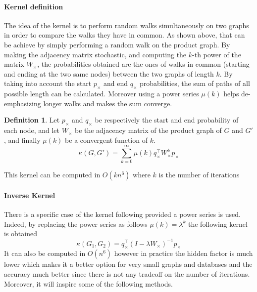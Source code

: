 \documentclass{article}
\theoremstyle{definition}
\newtheorem{definition}{Definition}
\begin{document}
\paragraph{Kernel definition}
The idea of the kernel is to perform random walks simultaneously on two graphs in order to compare the walks they have in common. As shown above, that can be achieve by simply performing a random walk on the product graph. 
By making the adjacency matrix stochastic, and computing the $k$-th power of the matrix $W_\times$, the probabilities obtained are the ones of walks in common (starting and ending at the two same nodes) between the two graphs of length $k$.
By taking into account the start $p_\times$ and end $q_\times$ probabilities, the sum of paths of all possible length can be calculated. Moreover using a power series $\mu(k)$ helps de-emphasizing longer walks and makes the sum converge. 
\begin{definition}Let $p_{\times}$ and $q_{\times}$ be respectively the start and end probability of each node, and let $W_{\times}$ be the adjacency matrix of the product graph of $G$ and $G'$, and finally $\mu(k)$ be a convergent function of $k$.
	\begin{equation}
		\kappa(G,G') = \sum\limits_{k=0}^{\infty}\mu(k)q_{\times}^{\top}W_{\times}^{k}p_{\times}
	\end{equation}
\end{definition}
This kernel can be computed in $O(kn^6)$ where $k$ is the number of iterations 
\paragraph{Inverse Kernel}
There is a specific case of the kernel following provided a power series is used. Indeed, by replacing the power series as follows $\mu(k)=\lambda^k$ the following kernel is obtained 
\begin{equation}
	\kappa(G_1,G_2)=q_{\times}^{\top}(I-\lambda W_\times)^{-1}p_{\times}
\end{equation}
It can also be computed in $O(n^6)$ however in practice the hidden factor is much lower which makes it a better option for very small graphs and databases and the accuracy much better since there is not any tradeoff on the number of iterations. Moreover, it will inspire some of the following methods.
\end{document}
